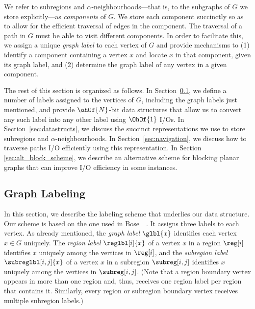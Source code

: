{We refer to subregions and $\alpha$-neighbourhoods---that is, to the
subgraphs of $G$ we store explicitly---as \emph{components} of $G$.
We store each component succinctly so as to allow for the efficient
traversal of edges in the component.
The traversal of a path in $G$ must be able to visit different components.
In order to facilitate this, we assign a unique \emph{graph label} to each vertex of $G$
and provide mechanisms to (1) identify a component containing a vertex $x$ and
locate $x$ in that component, given its graph label, and (2) determine
the graph label of any vertex in a given component.

The rest of this section is organized as follows.
In Section~\ref{sec:graph_labelling}, we define a number of labels
assigned to the vertices of $G$, including the graph labels just
mentioned, and provide $\ohOf{N}$-bit data structures that allow us to
convert any such label into any other label using $\OhOf{1}$ I/Os.
In Section~\ref{sec:datastructs}, we discuss the succinct
representations we use to store subregions and
$\alpha$-neighbourhoods.
In Section~\ref{sec:navigation},
we discuss how to traverse paths I/O efficiently using this
representation.
In Section \ref{sec:alt_block_scheme}, we describe an 
alternative scheme
for blocking planar graphs that can improve I/O efficiency in 
some instances.

\subsection{Graph Labeling}

\label{sec:graph_labelling}

In this section, we describe the labeling scheme that underlies our
data structure.
Our scheme is based on the one used in
Bose~\etal~\cite{DBLP:journals/talg/BoseCHMM12}.
It assigns three labels to each vertex.
As already mentioned, the \emph{graph label} $\glbl{x}$ identifies each vertex
$x \in G$ uniquely.
The \emph{region label} $\reglbl[i]{x}$ of a vertex $x$ in a region $\reg[i]$
identifies $x$ uniquely among the vertices in $\reg[i]$, and the
\emph{subregion label} $\subreglbl[i,j]{x}$ of a vertex $x$ in a subregion
$\subreg[i,j]$ identifies $x$ uniquely
among the vertices in $\subreg[i,j]$.
(Note that a region boundary vertex appears in more than one region and,
thus, receives one region label per region that contains it.
Similarly, every region or subregion boundary vertex receives multiple
subregion labels.)

}
